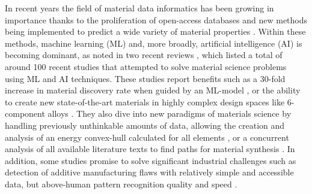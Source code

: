 \label{sipfenn:ssec:Motivation}
In recent years the field of material data informatics has been growing in importance thanks to the proliferation of open-access databases \cite{Saal2013MaterialsOQMD,Kirklin2015TheEnergies, vandeWalle2018TheDatabase,Jain2013Commentary:Innovation,Curtarolo2013AFLOW:Discovery,Toher2018TheDiscovery,Pizzi2016AiiDA:Science} and new methods being implemented to predict a wide variety of material properties \cite{Isayev2017UniversalCrystals, Legrain2017HowSolids, Pilania1987MachineSuperlattices, Jung2019BayesianSteels, Ouyang2020ComputationalConductors,Bucior2019Energy-based,Chandrasekaran2019SolvingLearning, Kim2018Machine-learning-acceleratedCompounds,Wen2019MachineProperty, Scime2019UsingProcess}. Within these methods, machine learning (ML) and, more broadly, artificial intelligence (AI) is becoming dominant, as noted in two recent reviews \cite{Schmidt2019RecentScience, Vasudevan2019MaterialsPhysics}, which listed a total of around 100 recent studies that attempted to solve material science problems using ML and AI techniques. These studies report benefits such as a 30-fold increase in material discovery rate when guided by an ML-model \cite{Kim2018Machine-learning-acceleratedCompounds}, or the ability to create new state-of-the-art materials in highly complex design spaces like 6-component alloys \cite{Wen2019MachineProperty}. They also dive into new paradigms of materials science by handling previously unthinkable amounts of data, allowing the creation and analysis of an energy convex-hull calculated for all elements \cite{Aykol2019NetworkDiscovery, I.Hegde2020TheMaterials}, or a concurrent analysis of all available literature texts to find paths for material synthesis \cite{Kononova2019Text-minedRecipes}. In addition, some studies promise to solve significant industrial challenges such as detection of additive manufacturing flaws with relatively simple and accessible data, but above-human pattern recognition quality and speed \cite{Scime2019UsingProcess}.

